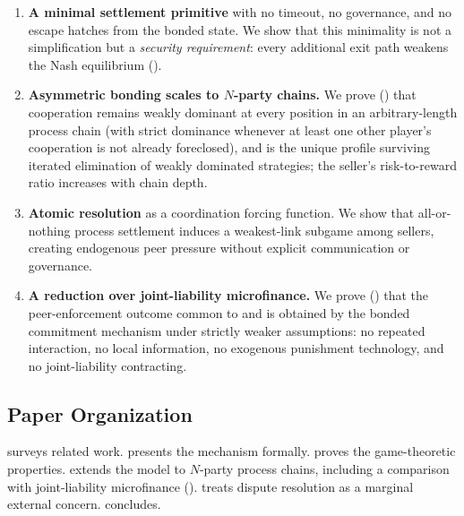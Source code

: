 \documentclass[11pt,a4paper]{article}
\theoremstyle{definition}
\theoremstyle{remark}
\begin{document}
\begin{enumerate}[label=(\roman*)]
  \item \textbf{A minimal settlement primitive} with no timeout, no
    governance, and no escape hatches from the bonded state. We show
    that this minimality is not a simplification but a \emph{security
    requirement}: every additional exit path weakens the Nash
    equilibrium ().

  \item \textbf{Asymmetric bonding scales to $N$-party chains.} We
    prove () that cooperation remains weakly
    dominant at every position in an arbitrary-length process chain
    (with strict dominance whenever at least one other player's
    cooperation is not already foreclosed), and is the unique profile
    surviving iterated elimination of weakly dominated strategies;
    the seller's risk-to-reward ratio increases with chain depth.

  \item \textbf{Atomic resolution} as a coordination forcing function.
    We show that all-or-nothing process settlement induces a
    weakest-link subgame among sellers, creating endogenous peer
    pressure without explicit communication or governance.

  \item \textbf{A reduction over joint-liability microfinance.} We
    prove () that the
    peer-enforcement outcome common to \citet{ghatak1999} and
    \citet{stiglitz1990} is obtained by the bonded commitment
    mechanism under strictly weaker assumptions: no repeated
    interaction, no local information, no exogenous punishment
    technology, and no joint-liability contracting.

\end{enumerate}

\subsection{Paper Organization}

 surveys related work.  presents
the mechanism formally.  proves the
game-theoretic properties.  extends the model
to $N$-party process chains, including a comparison with
joint-liability microfinance ().
 treats dispute resolution as a marginal external
concern.  concludes.
\end{document}
